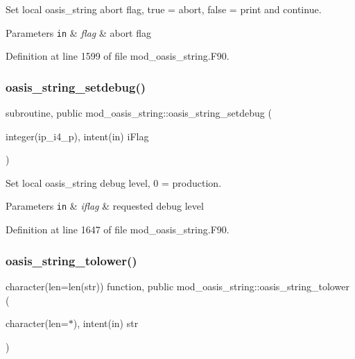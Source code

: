 Set local oasis\+\_\+string abort flag, true = abort, false = print and continue. 


\begin{DoxyParams}[1]{Parameters}
\mbox{\tt in}  & {\em flag} & abort flag \\
\hline
\end{DoxyParams}


Definition at line 1599 of file mod\+\_\+oasis\+\_\+string.\+F90.

\mbox{\label{namespacemod__oasis__string_af5c49843654a2bc9ccedf2934571329d}} 
\subsubsection{\texorpdfstring{oasis\+\_\+string\+\_\+setdebug()}{oasis\_string\_setdebug()}}
{\footnotesize\ttfamily subroutine, public mod\+\_\+oasis\+\_\+string\+::oasis\+\_\+string\+\_\+setdebug (\begin{DoxyParamCaption}\item[{integer(ip\+\_\+i4\+\_\+p), intent(in)}]{i\+Flag }\end{DoxyParamCaption})}



Set local oasis\+\_\+string debug level, 0 = production. 


\begin{DoxyParams}[1]{Parameters}
\mbox{\tt in}  & {\em iflag} & requested debug level \\
\hline
\end{DoxyParams}


Definition at line 1647 of file mod\+\_\+oasis\+\_\+string.\+F90.

\mbox{\label{namespacemod__oasis__string_af339c54c982092a80960a5241ccae1fa}} 
\subsubsection{\texorpdfstring{oasis\+\_\+string\+\_\+tolower()}{oasis\_string\_tolower()}}
{\footnotesize\ttfamily character(len=len(str)) function, public mod\+\_\+oasis\+\_\+string\+::oasis\+\_\+string\+\_\+tolower (\begin{DoxyParamCaption}\item[{character(len=$\ast$), intent(in)}]{str }\end{DoxyParamCaption})}



